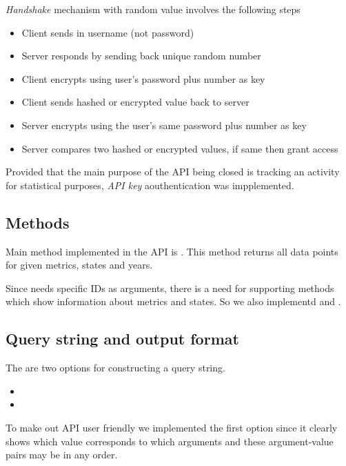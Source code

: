 			\emph{Handshake} mechanism with random value involves the following steps
			
			\begin{itemize}
				\item
					Client sends in username (not password)
				\item
					Server responds by sending back unique random number
				\item
					Client encrypts using user's password plus number as key
				\item
					Client sends hashed or encrypted value back to server
				\item
					Server encrypts using the user's same password plus number as key
				\item
					Server compares two hashed or encrypted values, if same then grant access
			\end{itemize}
			
			Provided that the main purpose of the API being closed is tracking an activity for statistical purposes, \emph{API key} aouthentication was impplemented.

		\subsection{Methods}
			
			Main method implemented in the API is . This method returns all data points for given metrics, states and years.
			
			Since  needs specific IDs as arguments, there is a need for supporting methods which show information about metrics and states. So we also implementd  and .

		\subsection{Query string and output format}
		
			The are two options for constructing a query string.
			\begin{itemize}
				\item
				\item
			\end{itemize}
			
			To make out API user friendly we implemented the first option since it clearly shows which value corresponds to which arguments and these argument-value pairs may be in any order.
			
